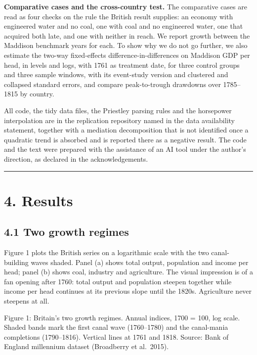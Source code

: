 \documentclass[
  11pt,
]{article}
\begin{document}
\textbf{Comparative cases and the cross-country test.} The comparative
cases are read as four checks on the rule the British result supplies:
an economy with engineered water and no coal, one with coal and no
engineered water, one that acquired both late, and one with neither in
reach. We report growth between the Maddison benchmark years for each.
To show why we do not go further, we also estimate the two-way
fixed-effects difference-in-differences on Maddison GDP per head, in
levels and logs, with 1761 as treatment date, for three control groups
and three sample windows, with its event-study version and clustered and
collapsed standard errors, and compare peak-to-trough drawdowns over
1785--1815 by country.

All code, the tidy data files, the Priestley parsing rules and the
horsepower interpolation are in the replication repository named in the
data availability statement, together with a mediation decomposition
that is not identified once a quadratic trend is absorbed and is
reported there as a negative result. The code and the text were prepared
with the assistance of an AI tool under the author's direction, as
declared in the acknowledgements.

\begin{center}\rule{0.5\linewidth}{0.5pt}\end{center}

\section{4. Results}\label{results}

\subsection{4.1 Two growth regimes}\label{two-growth-regimes}

Figure 1 plots the British series on a logarithmic scale with the two
canal-building waves shaded. Panel (a) shows total output, population
and income per head; panel (b) shows coal, industry and agriculture. The
visual impression is of a fan opening after 1760: total output and
population steepen together while income per head continues at its
previous slope until the 1820s. Agriculture never steepens at all.

Figure 1: Britain's two growth regimes. Annual indices, 1700 = 100, log
scale. Shaded bands mark the first canal wave (1760--1780) and the
canal-mania completions (1790--1816). Vertical lines at 1761 and 1818.
Source: Bank of England millennium dataset (Broadberry et al.~2015).
\end{document}
